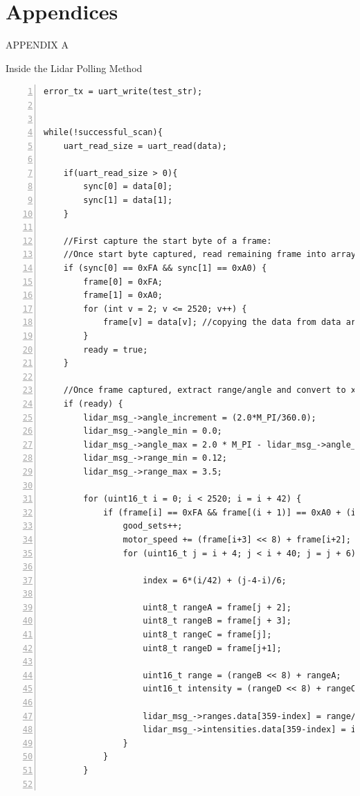 \documentclass[conference]{IEEEtran}
\begin{document}
\section{Appendices}
\begin{center}APPENDIX A
\end{center}
\begin{center}Inside the Lidar Polling Method
\end{center}
\begin{lstlisting}[frame=leftline, breaklines=true, numbers=left, stepnumber=1, numbersep=5pt]
error_tx = uart_write(test_str);


while(!successful_scan){
    uart_read_size = uart_read(data);
        
    if(uart_read_size > 0){
        sync[0] = data[0];
        sync[1] = data[1];
    }
    
    //First capture the start byte of a frame:
    //Once start byte captured, read remaining frame into array:
    if (sync[0] == 0xFA && sync[1] == 0xA0) {
        frame[0] = 0xFA;
        frame[1] = 0xA0;
        for (int v = 2; v <= 2520; v++) {
            frame[v] = data[v]; //copying the data from data array to frame
        }
        ready = true;
    }  
    
    //Once frame captured, extract range/angle and convert to x/y:
    if (ready) {
        lidar_msg_->angle_increment = (2.0*M_PI/360.0);
        lidar_msg_->angle_min = 0.0;
        lidar_msg_->angle_max = 2.0 * M_PI - lidar_msg_->angle_increment;
        lidar_msg_->range_min = 0.12;
        lidar_msg_->range_max = 3.5;
        
        for (uint16_t i = 0; i < 2520; i = i + 42) {
            if (frame[i] == 0xFA && frame[(i + 1)] == 0xA0 + (i / 42)) {                    
                good_sets++;
                motor_speed += (frame[i+3] << 8) + frame[i+2]; //accumlate count for avg. time increment
                for (uint16_t j = i + 4; j < i + 40; j = j + 6) {
                
                    index = 6*(i/42) + (j-4-i)/6;

                    uint8_t rangeA = frame[j + 2];
                    uint8_t rangeB = frame[j + 3];
                    uint8_t rangeC = frame[j];
                    uint8_t rangeD = frame[j+1];

                    uint16_t range = (rangeB << 8) + rangeA;
                    uint16_t intensity = (rangeD << 8) + rangeC; 

                    lidar_msg_->ranges.data[359-index] = range/1000.0;
                    lidar_msg_->intensities.data[359-index] = intensity;
                }
            }
        }
        

\end{lstlisting}
\end{document}
